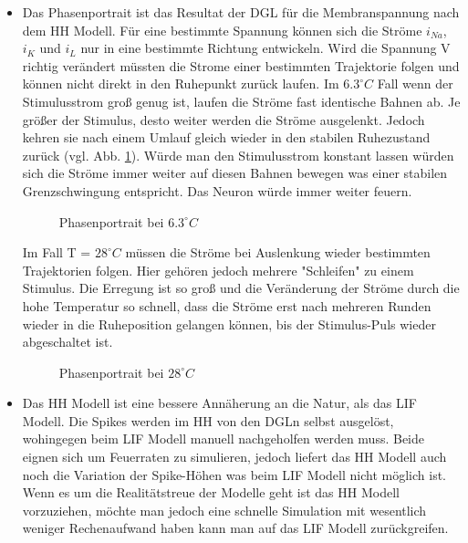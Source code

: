 \documentclass[conference]{IEEEtran}
\begin{document}
\begin{itemize}
\item Das Phasenportrait ist das Resultat der DGL für die Membranspannung nach dem HH Modell. Für eine bestimmte Spannung können sich die Ströme $i_{Na}$, $i_K$ und $i_L$ nur in eine bestimmte Richtung entwickeln. Wird die Spannung V richtig verändert müssten die Strome einer bestimmten Trajektorie folgen und können nicht direkt in den Ruhepunkt zurück laufen. Im $6.3^\circ C$ Fall wenn der Stimulusstrom groß genug ist, laufen die Ströme fast identische Bahnen ab. Je größer der Stimulus, desto weiter werden die Ströme ausgelenkt. Jedoch kehren sie nach einem Umlauf gleich wieder in den stabilen Ruhezustand zurück (vgl. Abb. \ref{fig:Phasenportrait6}). Würde man den Stimulusstrom konstant lassen würden sich die Ströme immer weiter auf diesen Bahnen bewegen was einer stabilen Grenzschwingung entspricht. Das Neuron würde immer weiter feuern.
\begin{figure}[h!]
  	\centering
    \scalebox{.6}{}
    \caption{Phasenportrait bei $6.3^\circ C$}
    \label{fig:Phasenportrait6}
\end{figure}
Im Fall T = $28^\circ C$ müssen die Ströme bei Auslenkung wieder bestimmten Trajektorien folgen. Hier gehören jedoch mehrere "Schleifen" zu einem Stimulus. Die Erregung ist so groß und die Veränderung der Ströme durch die hohe Temperatur so schnell, dass die Ströme erst nach mehreren Runden wieder in die Ruheposition gelangen können, bis der Stimulus-Puls wieder abgeschaltet ist. 
\begin{figure}[h!]
  	\centering
    \scalebox{.6}{}
    \caption{Phasenportrait bei $28^\circ C$}
    \label{fig:Phasenportrait28}
\end{figure}



\item Das HH Modell ist eine bessere Annäherung an die Natur, als das LIF Modell. Die Spikes werden im HH von den DGLn selbst ausgelöst, wohingegen beim LIF Modell manuell nachgeholfen werden muss. Beide eignen sich um Feuerraten zu simulieren, jedoch liefert das HH Modell auch noch die Variation der Spike-Höhen was beim LIF Modell nicht möglich ist. Wenn es um die Realitätstreue der Modelle geht ist das HH Modell vorzuziehen, möchte man jedoch eine schnelle Simulation mit wesentlich weniger Rechenaufwand haben kann man auf das LIF Modell zurückgreifen.
\end{itemize}
\end{document}
